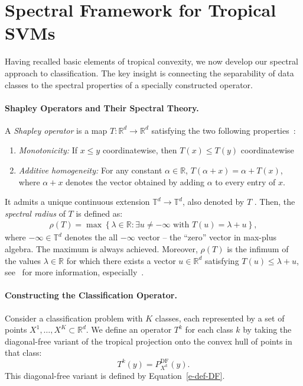 \documentclass{article}
\renewcommand{\leq}{\leqslant}
\newcommand{\R}{\mathbb{R}}
\newcommand{\T}{\mathbb{T}}
\begin{document}
\section{Spectral Framework for Tropical SVMs}\label{sec:spectral}

Having recalled basic elements of tropical convexity, we now develop our spectral approach to classification. The key insight is connecting the separability of data classes to the spectral properties of a specially constructed operator.

\paragraph{Shapley Operators and Their Spectral Theory.}
A {\em Shapley operator} is a map $T: \R^d \to \R^d$ satisfying the two following properties~\cite{kolokoltsov1992}:
\begin{enumerate}
    \item \textit{Monotonicity:} If $x \leq y$ coordinatewise, then $T(x) \leq T(y)$ coordinatewise
    \item \textit{Additive homogeneity:} For any constant $\alpha \in \R$, $T(\alpha + x) = \alpha + T(x)$,
      where $\alpha +x$ denotes the vector obtained by adding $\alpha$ to every entry of $x$.
\end{enumerate}
It admits a unique continuous extension $\T^d\to \T^d$, also denoted by $T$ \cite{AGGut10}. Then, the {\em spectral radius} of $T$ is defined as:
\begin{align}
\rho(T) = \max\left\{\lambda \in \R : \exists u \neq -\infty \text{ with } T(u) = \lambda + u\right\},
\end{align}
where $-\infty\in \T^d$ denotes the all $-\infty$ vector -- the ``zero'' vector in max-plus algebra.
The maximum is always achieved.
Moreover, $\rho(T)$ is the infimum of the values $\lambda\in \R$ for which there exists a vector $u\in\R^d$
satisfying $T(u) \leq \lambda + u$,
see~\cite{nussbaum1986,AGGut10,akiangaubertqisaadi} for more information,
especially~\cite[Theorem~7]{akiangaubertqisaadi}.

\paragraph{Constructing the Classification Operator.}
Consider a classification problem with $K$ classes, each represented by a set of points $X^1,\dots,X^K \subset \R^d$.
We define an operator $T^k$ for each class $k$ by taking the diagonal-free variant of the tropical projection onto the convex hull of points in that class:
\[
T^k(y) = P_{X^k}^{\text{DF}}(y).
\]
This diagonal-free variant is defined by Equation~\ref{e-def-DF}.
\end{document}
